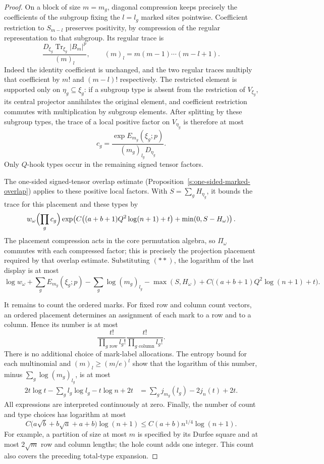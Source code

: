 \begin{proof}
On a block of size $m=m_g$, diagonal compression keeps precisely the
coefficients of the subgroup fixing the $l=l_g$ marked sites pointwise.
Coefficient restriction to $S_{m-l}$ preserves positivity, by compression
of the regular representation to that subgroup.  Its regular trace is
\[
 \frac{D_{\xi_g}\operatorname{Tr}_{\xi_g}|B_m|^p}{(m)_l},
 \qquad (m)_l=m(m-1)\cdots(m-l+1).
\]
Indeed the identity coefficient is unchanged, and the two regular
traces multiply that coefficient by $m!$ and $(m-l)!$ respectively.
The restricted element is supported only on $\eta_g\subseteq\xi_g$:
if a subgroup type is absent from the restriction of $V_{\xi_g}$, its
central projector annihilates the original element, and coefficient
restriction commutes with multiplication by subgroup elements.  After
splitting by these subgroup types, the trace of a local positive factor
on $V_{\eta_g}$ is therefore at most
\[
 c_g=\frac{\exp E_{m_g}(\xi_g;p)}{(m_g)_{l_g}D_{\eta_g}}.
 \tag{$\ast\ast$}
\]
Only $Q$-hook types occur in the remaining signed tensor factors.

The one-sided signed-tensor overlap estimate
(Proposition~\ref{s:one-sided-marked-overlap}) applies to these positive
local factors.  With $S=\sum_g H_{\eta_g}$, it bounds the trace for this
placement and these types by
\[
 w_\omega\Bigl(\prod_g c_g\Bigr)
 \exp\!\left(C\bigl((a+b+1)Q^2\log(n+1)+t\bigr)
                +\min(0,S-H_\omega)\right).
\]
The placement compression acts in the core permutation algebra, so
$\Pi_\omega$ commutes with each compressed factor; this is precisely
the projection placement required by that overlap estimate.  Substituting
$(\ast\ast)$, the logarithm of the last display is at most
\[
 \log w_\omega+\sum_g E_{m_g}(\xi_g;p)
       -\sum_g\log(m_g)_{l_g}-\max(S,H_\omega)
       +C\bigl((a+b+1)Q^2\log(n+1)+t\bigr).
 \tag{$\ast\ast\ast$}
\]

It remains to count the ordered marks.  For fixed row and column count
vectors, an ordered placement determines an assignment of each mark to
a row and to a column.  Hence its number is at most
\[
 \frac{t!}{\prod_{g\text{ row}}l_g!}
 \frac{t!}{\prod_{g\text{ column}}l_g!}.
\]
There is no additional choice of mark-label allocations.  The entropy
bound for each multinomial and $(m)_l\ge(m/e)^l$ show that the logarithm
of this number, minus $\sum_g\log(m_g)_{l_g}$, is at most
\begin{align*}
 2t\log t-\sum_g l_g\log l_g-t\log n+2t
   &=\sum_g j_{m_g}(l_g)-2j_n(t)+2t.
\end{align*}
All expressions are interpreted continuously at zero.  Finally, the
number of count and type choices has logarithm at most
\[
 C\bigl(a\sqrt b+b\sqrt a+a+b\bigr)\log(n+1)
 \le C(a+b)n^{1/4}\log(n+1).
\]
For example, a partition of size at most $m$ is specified by its Durfee
square and at most $2\sqrt m$ row and column lengths; the hole count
adds one integer.  This count also covers the preceding total-type
expansion.


\end{proof}
